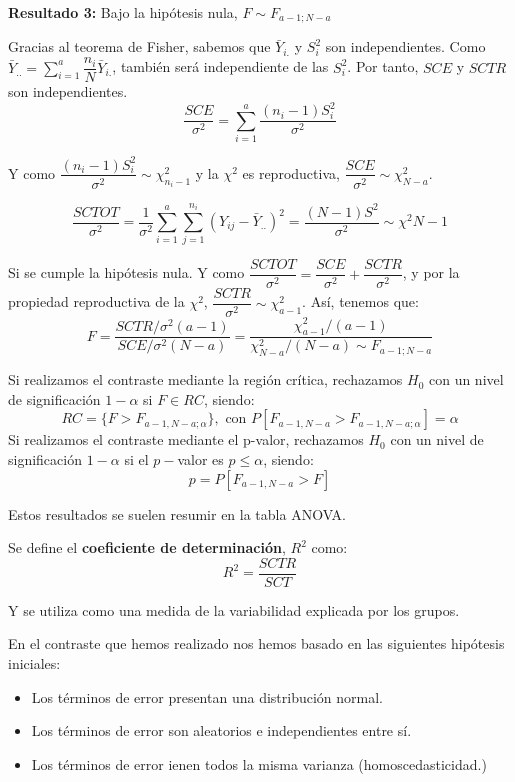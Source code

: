 \textbf{Resultado 3:} Bajo la hip\'otesis nula, $F\sim F_{a-1;N-a}$

Gracias al teorema de Fisher, sabemos que $\bar{Y}_{i.}$ y $S_i^2$ son independientes. Como $\bar{Y}_{..}=\sum_{i=1}^a\dfrac{n_i}{N}\bar{Y}_{i.}$, tambi\'en ser\'a independiente de las $S_i^2$. Por tanto, $SCE$ y $SCTR$ son independientes.
\[\dfrac{SCE}{\sigma^2}=\sum_{i=1}^a\dfrac{(n_i-1)S_i^2}{\sigma^2}\]

Y como $\dfrac{(n_i-1)S_i^2}{\sigma^2}\sim\chi^2_{n_i-1}$ y la $\chi^2$ es reproductiva, 
$\dfrac{SCE}{\sigma^2}\sim\chi^2_{N-a}$.

\[\dfrac{SCTOT}{\sigma^2}=\dfrac{1}{\sigma^2}\sum_{i=1}^a\sum_{j=1}^{n_i}(Y_{ij}-\bar{Y}_{..})^2=\dfrac{(N-1)S^2}{\sigma^2}\sim\chi^2{N-1}\]

Si se cumple la hip\'otesis nula. Y como $\dfrac{SCTOT}{\sigma^2}=\dfrac{SCE}{\sigma^2}+\dfrac{SCTR}{\sigma^2}$, y por la propiedad reproductiva de la $\chi^2$, $\dfrac{SCTR}{\sigma^2}\sim\chi^2_{a-1}$. As\'i, tenemos que:
\[F=\dfrac{SCTR/\sigma^2(a-1)}{SCE/\sigma^2(N-a)}=\dfrac{\chi^2_{a-1}/(a-1)}{\chi^2_{N-a}/(N-a)\sim F_{a-1;N-a}}\]

Si realizamos el contraste mediante la regi\'on cr\'itica, rechazamos $H_0$ con un nivel de significaci\'on $1-\alpha$ si $F\in RC$, siendo:
\[RC=\{F>F_{a-1,N-a;\alpha}\}, \text{ con } P[F_{a-1,N-a}>F_{a-1,N-a;\alpha}]=\alpha\]
Si realizamos el contraste mediante el p-valor, rechazamos $H_0$ con un nivel de significaci\'on $1-\alpha$ si el $p-$valor es $p\leq\alpha$, siendo:
\[p=P[F_{a-1,N-a}>F]\]

Estos resultados se suelen resumir en la tabla ANOVA.

Se define el \textbf{coeficiente de determinaci\'on}, $R^2$ como:
\[R^2=\dfrac{SCTR}{SCT}\]

Y se utiliza como una medida de la variabilidad explicada por los grupos.


En el contraste que hemos realizado nos hemos basado en las siguientes hip\'otesis iniciales:

\begin{itemize}
\item Los t\'erminos de error presentan una distribuci\'on normal.
\item Los t\'erminos de error son aleatorios e independientes entre s\'i.
\item Los t\'erminos de error ienen todos la misma varianza (homoscedasticidad.)
\end{itemize}

